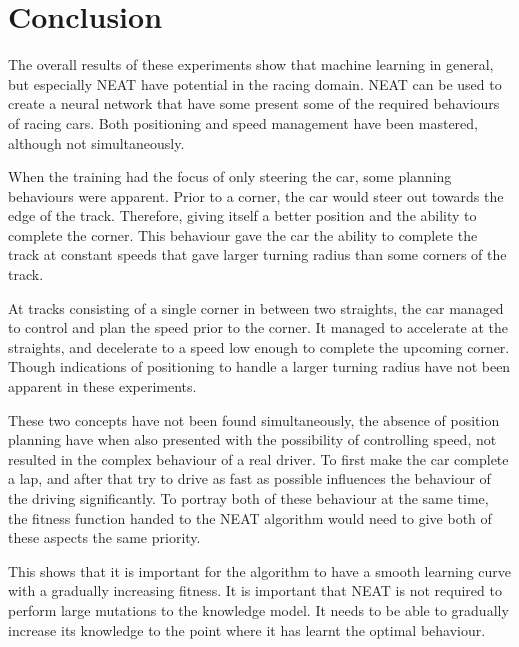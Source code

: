 \section{Conclusion}
\label{conclusion}
The overall results of these experiments show that machine learning in general, but especially NEAT have potential in the racing domain. NEAT can be used to create a neural network that have some present some of the required behaviours of racing cars. Both positioning and speed management have been mastered, although not simultaneously.

When the training had the focus of only steering the car, some planning behaviours were apparent. Prior to a corner, the car would steer out towards the edge of the track. Therefore, giving itself a better position and the ability to complete the corner. This behaviour gave the car the ability to complete the track at constant speeds that gave larger turning radius than some corners of the track.

At tracks consisting of a single corner in between two straights, the car managed to control and plan the speed prior to the corner. It managed to accelerate at the straights, and decelerate to a speed low enough to complete the upcoming corner. Though indications of positioning to handle a larger turning radius have not been apparent in these experiments.

These two concepts have not been found simultaneously, the absence of position planning have when also presented with the possibility of controlling speed, not resulted in the complex behaviour of a real driver. To first make the car complete a lap, and after that try to drive as fast as possible influences the behaviour of the driving significantly. To portray both of these behaviour at the same time, the fitness function handed to the NEAT algorithm would need to give both of these aspects the same priority.

This shows that it is important for the algorithm to have a smooth learning curve with a gradually increasing fitness. It is important that NEAT is not required to perform large mutations to the knowledge model. It needs to be able to gradually increase its knowledge to the point where it has learnt the optimal behaviour.


